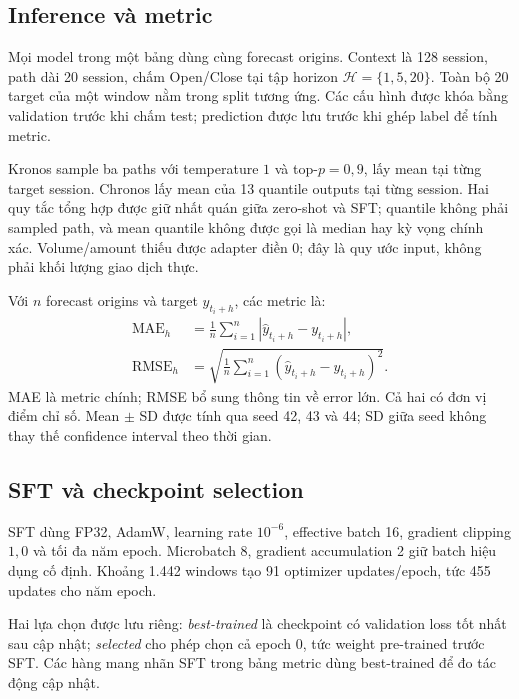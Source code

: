 \documentclass[11pt,a4paper]{article}
\begin{document}
\subsection{Inference và metric}
Mọi model trong một bảng dùng cùng forecast origins. Context là 128
session, path dài 20 session, chấm Open/Close tại tập horizon
$\mathcal H=\{1,5,20\}$. Toàn bộ 20 target của một window nằm trong
split tương ứng. Các cấu hình được khóa bằng validation trước khi chấm
test; prediction được lưu trước khi ghép label để tính metric.

Kronos sample ba paths với temperature $1$ và top-$p=0,9$, lấy mean tại
từng target session. Chronos lấy mean của 13 quantile outputs tại từng
session. Hai quy tắc tổng hợp được giữ nhất quán giữa zero-shot và SFT;
quantile không phải sampled path, và mean quantile không được gọi là
median hay kỳ vọng chính xác. Volume/amount thiếu được adapter điền 0;
đây là quy ước input, không phải khối lượng giao dịch thực.

Với $n$ forecast origins và target $y_{t_i+h}$, các metric là:
\begin{align}
 \mathrm{MAE}_h&=\frac1n\sum_{i=1}^{n}
    |\widehat y_{t_i+h}-y_{t_i+h}|,\\
 \mathrm{RMSE}_h&=\sqrt{\frac1n\sum_{i=1}^{n}
    (\widehat y_{t_i+h}-y_{t_i+h})^2}.
\end{align}
MAE là metric chính; RMSE bổ sung thông tin về error lớn. Cả hai có đơn
vị điểm chỉ số. Mean $\pm$ SD được tính qua seed 42, 43 và 44; SD giữa
seed không thay thế confidence interval theo thời gian.

\subsection{SFT và checkpoint selection}
SFT dùng FP32, AdamW, learning rate $10^{-6}$, effective batch 16,
gradient clipping $1,0$ và tối đa năm epoch. Microbatch 8, gradient
accumulation 2 giữ batch hiệu dụng cố định. Khoảng 1.442 windows tạo
91 optimizer updates/epoch, tức 455 updates cho năm epoch.

Hai lựa chọn được lưu riêng: \emph{best-trained} là checkpoint có
validation loss tốt nhất sau cập nhật; \emph{selected} cho phép chọn
cả epoch 0, tức weight pre-trained trước SFT. Các hàng mang nhãn SFT
trong bảng metric dùng best-trained để đo tác động cập nhật.

\begin{table}[htbp]
\centering\small
\caption{Epoch được chọn; mỗi model có cùng kết quả lựa chọn ở ba seed.}
\label{tab:epoch}

\end{table}
\end{document}
